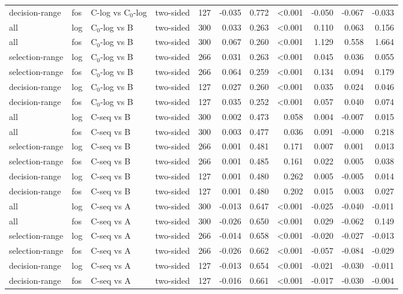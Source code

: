 \begin{longtable}{llllrrrrrrr}
decision-range & fos & C-log vs C$_0$-log & two-sided & 127 & -0.035 & 0.772 & <0.001 & -0.050 & -0.067 & -0.033 \\
all & log & C$_0$-log vs B & two-sided & 300 & 0.033 & 0.263 & <0.001 & 0.110 & 0.063 & 0.156 \\
all & fos & C$_0$-log vs B & two-sided & 300 & 0.067 & 0.260 & <0.001 & 1.129 & 0.558 & 1.664 \\
selection-range & log & C$_0$-log vs B & two-sided & 266 & 0.031 & 0.263 & <0.001 & 0.045 & 0.036 & 0.055 \\
selection-range & fos & C$_0$-log vs B & two-sided & 266 & 0.064 & 0.259 & <0.001 & 0.134 & 0.094 & 0.179 \\
decision-range & log & C$_0$-log vs B & two-sided & 127 & 0.027 & 0.260 & <0.001 & 0.035 & 0.024 & 0.046 \\
decision-range & fos & C$_0$-log vs B & two-sided & 127 & 0.035 & 0.252 & <0.001 & 0.057 & 0.040 & 0.074 \\
all & log & C-seq vs B & two-sided & 300 & 0.002 & 0.473 & 0.058 & 0.004 & -0.007 & 0.015 \\
all & fos & C-seq vs B & two-sided & 300 & 0.003 & 0.477 & 0.036 & 0.091 & -0.000 & 0.218 \\
selection-range & log & C-seq vs B & two-sided & 266 & 0.001 & 0.481 & 0.171 & 0.007 & 0.001 & 0.013 \\
selection-range & fos & C-seq vs B & two-sided & 266 & 0.001 & 0.485 & 0.161 & 0.022 & 0.005 & 0.038 \\
decision-range & log & C-seq vs B & two-sided & 127 & 0.001 & 0.480 & 0.262 & 0.005 & -0.005 & 0.014 \\
decision-range & fos & C-seq vs B & two-sided & 127 & 0.001 & 0.480 & 0.202 & 0.015 & 0.003 & 0.027 \\
all & log & C-seq vs A & two-sided & 300 & -0.013 & 0.647 & <0.001 & -0.025 & -0.040 & -0.011 \\
all & fos & C-seq vs A & two-sided & 300 & -0.026 & 0.650 & <0.001 & 0.029 & -0.062 & 0.149 \\
selection-range & log & C-seq vs A & two-sided & 266 & -0.014 & 0.658 & <0.001 & -0.020 & -0.027 & -0.013 \\
selection-range & fos & C-seq vs A & two-sided & 266 & -0.026 & 0.662 & <0.001 & -0.057 & -0.084 & -0.029 \\
decision-range & log & C-seq vs A & two-sided & 127 & -0.013 & 0.654 & <0.001 & -0.021 & -0.030 & -0.011 \\
decision-range & fos & C-seq vs A & two-sided & 127 & -0.016 & 0.661 & <0.001 & -0.017 & -0.030 & -0.004 \\

\end{longtable}
